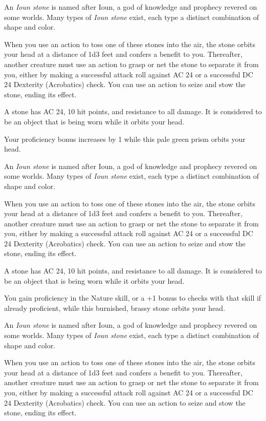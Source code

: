 \documentclass[10pt,a4paper,twoside,bg=print,twocolumn,openany,nodeprecatedcode]{dndbook}
\begin{document}
An \textit{Ioun stone} is named after Ioun, a god of knowledge and prophecy revered on some worlds. Many types of \textit{Ioun stone} exist, each type a distinct combination of shape and color.

When you use an action to toss one of these stones into the air, the stone orbits your head at a distance of 1d3 feet and confers a benefit to you. Thereafter, another creature must use an action to grasp or net the stone to separate it from you, either by making a successful attack roll against AC 24 or a successful DC 24 Dexterity (Acrobatics) check. You can use an action to seize and stow the stone, ending its effect.

A stone has AC 24, 10 hit points, and resistance to all damage. It is considered to be an object that is being worn while it orbits your head.

Your proficiency bonus increases by 1 while this pale green prism orbits your head.

An \textit{Ioun stone} is named after Ioun, a god of knowledge and prophecy revered on some worlds. Many types of \textit{Ioun stone} exist, each type a distinct combination of shape and color.

When you use an action to toss one of these stones into the air, the stone orbits your head at a distance of 1d3 feet and confers a benefit to you. Thereafter, another creature must use an action to grasp or net the stone to separate it from you, either by making a successful attack roll against AC 24 or a successful DC 24 Dexterity (Acrobatics) check. You can use an action to seize and stow the stone, ending its effect.

A stone has AC 24, 10 hit points, and resistance to all damage. It is considered to be an object that is being worn while it orbits your head.

You gain proficiency in the Nature skill, or a +1 bonus to checks with that skill if already proficient, while this burnished, brassy stone orbits your head.

An \textit{Ioun stone} is named after Ioun, a god of knowledge and prophecy revered on some worlds. Many types of \textit{Ioun stone} exist, each type a distinct combination of shape and color.

When you use an action to toss one of these stones into the air, the stone orbits your head at a distance of 1d3 feet and confers a benefit to you. Thereafter, another creature must use an action to grasp or net the stone to separate it from you, either by making a successful attack roll against AC 24 or a successful DC 24 Dexterity (Acrobatics) check. You can use an action to seize and stow the stone, ending its effect.
\end{document}
